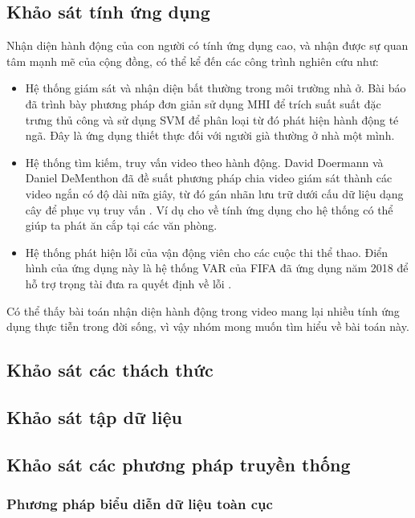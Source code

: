 \subsection{Khảo sát tính ứng dụng}

Nhận diện hành động của con người có tính ứng dụng cao, và nhận được sự quan tâm mạnh mẽ của cộng đồng, có thể kể đến các công trình nghiên cứu như:

\begin{itemize}
    \item Hệ thống giám sát và nhận diện bất thường trong môi trường nhà ở. Bài báo \cite{gunale2019intelligent} đã trình bày phương pháp đơn giản sử dụng MHI để trích suất suất đặc trưng thủ công và sử dụng SVM để phân loại từ đó phát hiện hành động té ngã. Đây là ứng dụng thiết thực đối với người già thường ở nhà một mình.
    \item Hệ thống tìm kiếm, truy vấn video theo hành động. David Doermann và Daniel DeMenthon đã đề suất phương pháp chia video giám sát thành các video ngắn có độ dài nữa giây, từ đó gán nhãn lưu trữ dưới cấu dữ liệu dạng cây để phục vụ truy vấn \cite{lin2012human}. Ví dụ cho về tính ứng dụng cho hệ thống có thể giúp ta phát ăn cắp tại các văn phòng.
    \item Hệ thống phát hiện lỗi của vận động viên cho các cuộc thi thể thao. Điển hình của ứng dụng này là hệ thống VAR của FIFA đã ứng dụng năm 2018 để  hỗ trợ trọng tài đưa ra quyết định về lỗi \cite{petersen2019var}.
\end{itemize}

Có thể thấy bài toán nhận diện hành động trong video mang lại nhiều tính ứng dụng thực tiễn trong đời sống, vì vậy nhóm mong muốn tìm hiểu về bài toán này.

\subsection{Khảo sát các thách thức}

\subsection{Khảo sát tập dữ liệu}

\subsection{Khảo sát các phương pháp truyền thống}

\subsubsection{Phương pháp biểu diễn dữ liệu toàn cục}


